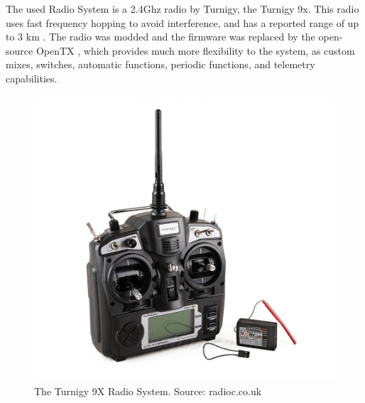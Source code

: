 The used Radio System is a 2.4Ghz radio by Turnigy, the Turnigy 9x.
%
This radio uses fast frequency hopping to avoid interference, and has a reported range of up to 3 km \cite{range9x}.
%
The radio was modded\cite{t9xmod} and the firmware was replaced by the open-source OpenTX \cite{opentx}, which provides much more flexibility to the system, as custom mixes, switches, automatic functions, periodic functions, and telemetry capabilities.

\begin{figure}[H]
\centering
  \includegraphics[width=0.8\linewidth]{figs/t9x.jpg}
  \caption{The Turnigy 9X Radio System. Source: radioc.co.uk}
  \label{fig:t9x}
\end{figure}


